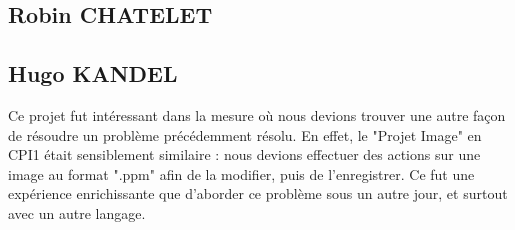 \documentclass[12pt,a4paper]{article}
\begin{document}
\subsection{Robin CHATELET}

\subsection{Hugo KANDEL}
Ce projet fut intéressant dans la mesure où nous devions trouver une autre façon de résoudre un problème précédemment résolu.\newline
En effet, le "Projet Image" en CPI1 était sensiblement similaire : nous devions effectuer des actions sur une image au format ".ppm" afin de la modifier, puis de l'enregistrer.\newline
Ce fut une expérience enrichissante que d'aborder ce problème sous un autre jour, et surtout avec un autre langage.
\end{document}
